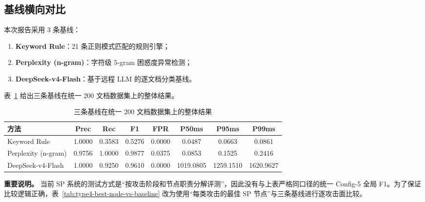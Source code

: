 \documentclass[11pt,a4paper]{ctexart}
\begin{document}
\subsection{基线横向对比}
本次报告采用 3 条基线：
\begin{enumerate}[leftmargin=2em]
  \item \textbf{Keyword Rule}：21 条正则模式匹配的规则引擎；
  \item \textbf{Perplexity (n-gram)}：字符级 5-gram 困惑度异常检测；
  \item \textbf{DeepSeek-v4-Flash}：基于远程 LLM 的逐文档分类基线。
\end{enumerate}

表~\ref{tab:type4-baseline-overall} 给出三条基线在统一 200 文档数据集上的整体结果。

\begin{table}[H]
\centering
\caption{三条基线在统一 200 文档数据集上的整体结果}
\label{tab:type4-baseline-overall}
\begin{tabular}{l c c c c c c c}
\toprule
方法 & Prec & Rec & F1 & FPR & P50ms & P95ms & P99ms \\
\midrule
Keyword Rule & 1.0000 & 0.3583 & 0.5276 & 0.0000 & 0.0487 & 0.0663 & 0.0861 \\
Perplexity (n-gram) & 0.9756 & 1.0000 & 0.9877 & 0.0375 & 0.0853 & 0.1525 & 0.2416 \\
DeepSeek-v4-Flash & 1.0000 & 0.9250 & 0.9610 & 0.0000 & 1019.0805 & 1259.1510 & 1620.9627 \\
\bottomrule
\end{tabular}
\end{table}

\textbf{重要说明。} 当前 SP 系统的测试方式是“按攻击阶段和节点职责分解评测”，因此没有与上表严格同口径的统一 Config-5 全局 F1。为了保证比较逻辑正确，表~\ref{tab:type4-best-node-vs-baseline} 改为使用“每类攻击的最佳 SP 节点”与三条基线进行逐攻击面比较。

\begin{table}[H]
\centering
\caption{每类攻击的最佳 SP 节点与三条基线对比（F1）}
\label{tab:type4-best-node-vs-baseline}
\end{table}
\end{document}
